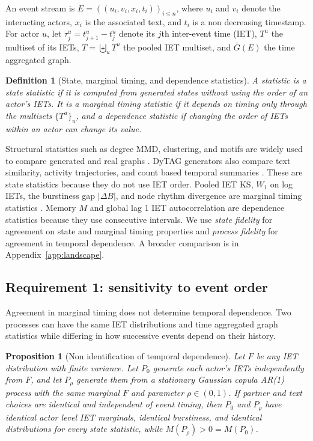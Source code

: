 \documentclass{article}
\newtheorem{definition}{Definition}
\newtheorem{proposition}{Proposition}
\newcommand{\Gagg}{\bar G}
\newcommand{\iet}{\tau}
\begin{document}
An event stream is
$E=((u_i,v_i,x_i,t_i))_{i\le n}$, where $u_i$ and $v_i$ denote the
interacting actors, $x_i$ is the associated text, and $t_i$ is a
non decreasing timestamp. For actor $u$, let
$\iet^u_j=t^u_{j+1}-t^u_j$ denote its $j$th inter-event time (IET),
$T^u$ the multiset of its IETs, $T=\biguplus_u T^u$ the pooled IET
multiset, and $\Gagg(E)$ the time aggregated graph.

\begin{definition}[State, marginal timing, and dependence statistics]
\label{def:state}
A statistic is a \emph{state statistic} if it is computed from generated
states without using the order of an actor's IETs. It is a \emph{marginal
timing statistic} if it depends on timing only through the multisets
$\{T^u\}_u$, and a \emph{dependence statistic} if changing the order of IETs
within an actor can change its value.
\end{definition}

Structural statistics such as degree MMD, clustering, and motifs are widely
used to compare generated and real graphs
\citep{you2018graphrnn,liao2019gran,obray2022evaluation}. DyTAG generators also
compare text similarity, activity trajectories, and count based temporal
summaries \citep{ji2025gag,peng2025gdgb,ji2026graphia}. These are state
statistics because they do not use IET order. Pooled IET KS, $W_1$ on log
IETs, the burstiness gap $|\Delta B|$, and node rhythm divergence are marginal
timing statistics \citep{goh2008burstiness,karsai2012universal}. Memory $M$
and global lag 1 IET autocorrelation are dependence statistics because they
use consecutive intervals. We use \emph{state fidelity} for agreement on state
and marginal timing properties and \emph{process fidelity} for agreement in
temporal dependence. A broader comparison is in Appendix~\ref{app:landscape}.

\subsection{Requirement 1: sensitivity to event order}

Agreement in marginal timing does not determine temporal dependence. Two
processes can have the same IET distributions and time aggregated graph
statistics while differing in how successive events depend on their history.

\begin{proposition}[Non identification of temporal dependence]
\label{prop:nonident}
Let $F$ be any IET distribution with finite variance. Let $P_0$ generate each
actor's IETs independently from $F$, and let $P_\rho$ generate them from a
stationary Gaussian copula AR(1) process with the same marginal $F$ and
parameter $\rho\in(0,1)$. If partner and text choices are identical and
independent of event timing, then $P_0$ and $P_\rho$ have identical actor level
IET marginals, identical burstiness, and identical distributions for every
state statistic, while $M(P_\rho)>0=M(P_0)$.
\end{proposition}
\end{document}
